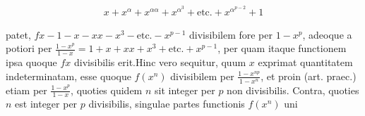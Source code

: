 \[
\begin{aligned}
x+x^\alpha+x^{\alpha\alpha}+x^{\alpha^3}+\text{etc.}+x^{\alpha^{p-2}}+1
\end{aligned}
\]

patet, $fx-1- x-xx-x^3-\text{etc.}-x^{p-1}$ divisibilem fore per $1-x^p$, adeoque a potiori per $\frac{1-x^p}{1-x}=1+x+xx+x^3+\text{etc.}+x^{p-1}$, per quam itaque functionem ipsa quoque $fx$ divisibilis erit.\quad Hinc vero sequitur, quum $x$ exprimat quantitatem indeterminatam, esse quoque $f(x^n)$ divisibilem per $\frac{1-x^{np}}{1-x^n}$, et proin (art. praec.) etiam per $\frac{1-x^p}{1-x}$, quoties quidem $n$ sit integer per $p$ non divisibilis. Contra, quoties $n$ est integer per $p$ divisibilis, singulae partes functionis $f(x^n)$ uni%
